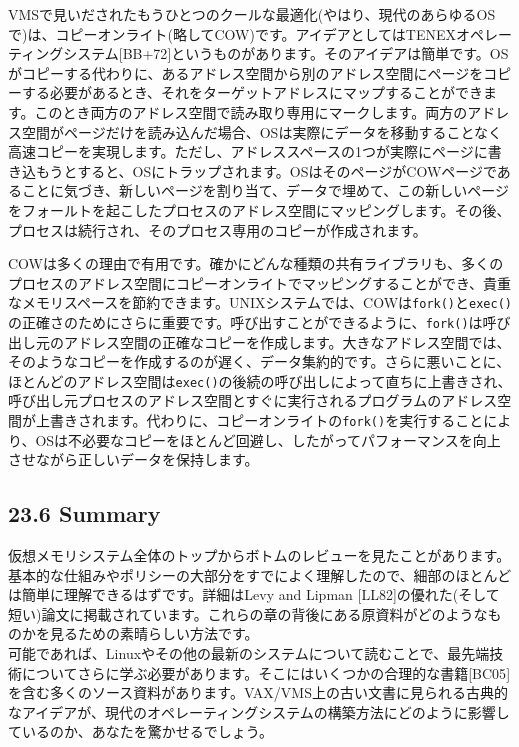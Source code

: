VMSで見いだされたもうひとつのクールな最適化(やはり、現代のあらゆるOSで)は、コピーオンライト(略してCOW)です。アイデアとしてはTENEXオペレーティングシステム{[}BB+72{]}というものがあります。そのアイデアは簡単です。OSがコピーする代わりに、あるアドレス空間から別のアドレス空間にページをコピーする必要があるとき、それをターゲットアドレスにマップすることができます。このとき両方のアドレス空間で読み取り専用にマークします。両方のアドレス空間がページだけを読み込んだ場合、OSは実際にデータを移動することなく高速コピーを実現します。ただし、アドレススペースの1つが実際にページに書き込もうとすると、OSにトラップされます。OSはそのページがCOWページであることに気づき、新しいページを割り当て、データで埋めて、この新しいページをフォールトを起こしたプロセスのアドレス空間にマッピングします。その後、プロセスは続行され、そのプロセス専用のコピーが作成されます。

COWは多くの理由で有用です。確かにどんな種類の共有ライブラリも、多くのプロセスのアドレス空間にコピーオンライトでマッピングすることができ、貴重なメモリスペースを節約できます。UNIXシステムでは、COWは\texttt{fork()}と\texttt{exec()}の正確さのためにさらに重要です。呼び出すことができるように、\texttt{fork()}は呼び出し元のアドレス空間の正確なコピーを作成します。大きなアドレス空間では、そのようなコピーを作成するのが遅く、データ集約的です。さらに悪いことに、ほとんどのアドレス空間は\texttt{exec()}の後続の呼び出しによって直ちに上書きされ、呼び出し元プロセスのアドレス空間とすぐに実行されるプログラムのアドレス空間が上書きされます。代わりに、コピーオンライトの\texttt{fork()}を実行することにより、OSは不必要なコピーをほとんど回避し、したがってパフォーマンスを向上させながら正しいデータを保持します。

\hypertarget{summary-15}{%
\subsection*{23.6 Summary}\label{summary-15}}

仮想メモリシステム全体のトップからボトムのレビューを見たことがあります。基本的な仕組みやポリシーの大部分をすでによく理解したので、細部のほとんどは簡単に理解できるはずです。詳細はLevy
and Lipman
{[}LL82{]}の優れた(そして短い)論文に掲載されています。これらの章の背後にある原資料がどのようなものかを見るための素晴らしい方法です。\\
可能であれば、Linuxやその他の最新のシステムについて読むことで、最先端技術についてさらに学ぶ必要があります。そこにはいくつかの合理的な書籍{[}BC05{]}を含む多くのソース資料があります。VAX/VMS上の古い文書に見られる古典的なアイデアが、現代のオペレーティングシステムの構築方法にどのように影響しているのか、あなたを驚かせるでしょう。

